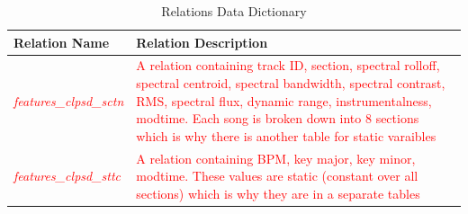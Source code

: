 \documentclass[12pt]{article}
\begin{document}
\vspace{1cm}
\begin{table}[htbp!]
  \centering
  \begin{tabular}{ p{.25\linewidth} || p{.65\linewidth} }
    \textbf{Relation Name} & \textbf{Relation Description} \\
    \toprule
    \textcolor{red}{\emph{features\_clpsd\_sctn}} & \textcolor{red}{A relation containing track ID, section, spectral rolloff, spectral centroid, spectral bandwidth, spectral contrast, RMS, spectral flux, dynamic range, instrumentalness, modtime. Each song is broken down into 8 sections which is why there is another table for static varaibles} \\
    \midrule
    \textcolor{red}{\emph{features\_clpsd\_sttc}} & \textcolor{red}{A relation containing BPM, key major, key minor, modtime. These values are static (constant over all sections) which is why they are in a separate tables} \\
  \end{tabular}
  \label{tbl:rel-data-dict}
  \caption{Relations Data Dictionary}
\end{table}
\vspace{1cm}
\end{document}
